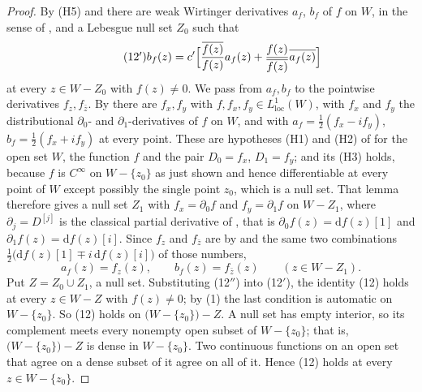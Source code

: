 \begin{proof}
By (H5) and  there are weak Wirtinger derivatives $a_f$,
$b_f$ of $f$ on $W$, in the sense of , and a
Lebesgue null set $Z_0$ such that
\begin{equation}\tag{12$'$}
  b_f(z)=c'\Bigl[\frac{\overline{f(z)}}{f(z)}a_f(z)
    +\frac{f(z)}{\overline{f(z)}}\overline{a_f(z)}\Bigr]
\end{equation}
at every $z\in W-Z_0$ with $f(z)\neq0$.  We pass from $a_f,b_f$ to the
pointwise derivatives $f_z,f_{\bar z}$.  By  there
are $f_x,f_y$ with $f,f_x,f_y\in L^1_{\mathrm{loc}}(W)$, with $f_x$ and $f_y$
the distributional $\partial_0$- and $\partial_1$-derivatives of $f$ on $W$,
and with $a_f=\tfrac12(f_x-if_y)$, $b_f=\tfrac12(f_x+if_y)$ at every point.
These are hypotheses (H1) and (H2) of  for the
open set $W$, the function $f$ and the pair $D_0=f_x$, $D_1=f_y$; and its (H3)
holds, because $f$ is $C^\infty$ on $W-\{z_0\}$ as just shown and hence
differentiable at every point of $W$ except possibly the single point $z_0$,
which is a null set.  That lemma therefore gives a null set $Z_1$ with
$f_x=\partial_0f$ and $f_y=\partial_1f$ on $W-Z_1$, where
$\partial_j=D^{[j]}$ is the classical partial derivative of
, that is $\partial_0f(z)=\mathrm{d}f(z)[1]$ and
$\partial_1f(z)=\mathrm{d}f(z)[i]$.  Since $f_z$ and $f_{\bar z}$ are by
 and  the same two combinations
$\tfrac12\bigl(\mathrm{d}f(z)[1]\mp i\,\mathrm{d}f(z)[i]\bigr)$ of those
numbers,
\begin{equation}\tag{12$''$}
  a_f(z)=f_z(z),\qquad b_f(z)=f_{\bar z}(z)\qquad(z\in W-Z_1).
\end{equation}
Put $Z=Z_0\cup Z_1$, a null set.  Substituting (12$''$) into (12$'$), the
identity (12) holds at every $z\in W-Z$ with $f(z)\neq0$; by (1) the last
condition is automatic on $W-\{z_0\}$.  So (12) holds on
$\bigl(W-\{z_0\}\bigr)-Z$.  A null set has empty interior, so its complement
meets every nonempty open subset of $W-\{z_0\}$; that is,
$\bigl(W-\{z_0\}\bigr)-Z$ is dense in $W-\{z_0\}$.  Two continuous functions on an
open set that agree on a dense subset of it agree on all of it.  Hence (12)
holds at every $z\in W-\{z_0\}$.


\end{proof}
